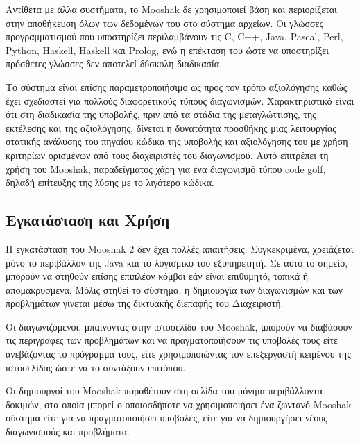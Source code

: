 \documentclass[diploma]{softlab-thesis}
\begin{document}
\bigskip

Αντίθετα με άλλα συστήματα, το Mooshak δε χρησιμοποιεί βάση και περιορίζεται
στην αποθήκευση όλων των δεδομένων του στο σύστημα αρχείων. Οι γλώσσες
προγραμματισμού που υποστηρίζει περιλαμβάνουν τις C, C++, Java, Pascal, Perl,
Python, Haskell, Haskell και Prolog, ενώ η επέκταση του ώστε να υποστηρίξει
πρόσθετες γλώσσες δεν αποτελεί δύσκολη διαδικασία.

\bigskip

Το σύστημα είναι επίσης παραμετροποιήσιμο ως προς τον τρόπο αξιολόγησης καθώς
έχει σχεδιαστεί για πολλούς διαφορετικούς τύπους διαγωνισμών. Χαρακτηριστικό
είναι ότι στη διαδικασία της υποβολής, πριν από τα στάδια της μεταγλώττισης,
της εκτέλεσης και της αξιολόγησης, δίνεται η δυνατότητα προσθήκης μιας
λειτουργίας στατικής ανάλυσης του πηγαίου κώδικα της υποβολής και αξιολόγησης
του με χρήση κριτηρίων ορισμένων από τους διαχειριστές του διαγωνισμού. Αυτό
επιτρέπει τη χρήση του Mooshak, παραδείγματος χάρη για ένα διαγωνισμό τύπου
code golf, δηλαδή επίτευξης της λύσης με το λιγότερο κώδικα.

\subsection{Εγκατάσταση και Χρήση}

Η εγκατάσταση του Mooshak 2 δεν έχει πολλές απαιτήσεις. Συγκεκριμένα,
χρειάζεται μόνο το περιβάλλον της Java και το λογισμικό του εξυπηρετητή. Σε
αυτό το σημείο, μπορούν να στηθούν επίσης επιπλέον κόμβοι εάν είναι επιθυμητό,
τοπικά ή απομακρυσμένα. Μόλις στηθεί το σύστημα, η δημιουργία των διαγωνισμών
και των προβλημάτων γίνεται μέσω της δικτυακής διεπαφής του Διαχειριστή.

\bigskip

Οι διαγωνιζόμενοι, μπαίνοντας στην ιστοσελίδα του Mooshak, μπορούν να διαβάσουν
τις περιγραφές των προβλημάτων και να πραγματοποιήσουν τις υποβολές τους είτε
ανεβάζοντας το πρόγραμμα τους, είτε χρησιμοποιώντας τον επεξεργαστή κειμένου της
ιστοσελίδας ώστε να το συντάξουν επιτόπου.

\bigskip

Οι δημιουργοί του Mooshak παραθέτουν στη σελίδα του μόνιμα περιβάλλοντα δοκιμών,
στα οποία μπορεί ο οποιοσδήποτε να χρησιμοποιήσει ένα ζωντανό Mooshak σύστημα είτε
για να πραγματοποιήσει υποβολές, είτε για να δημιουργήσει νέους διαγωνισμούς και
προβλήματα.

\bigskip
\end{document}
